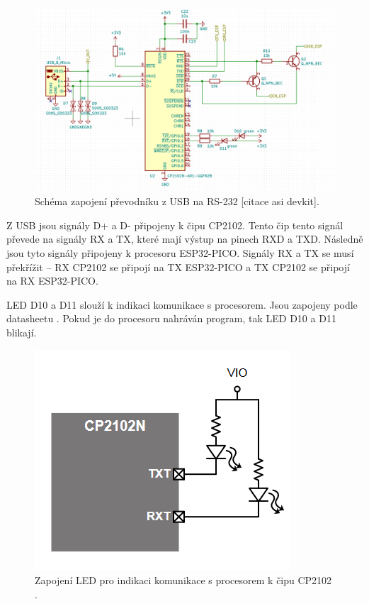 \begin{figure}[!h]
    \begin{center}
      \includegraphics[scale=0.5]{obrazky/CP2102_schema.png}
    \end{center}
    \caption[CP2102 schéma]{Schéma zapojení převodníku z USB na RS-232 [citace asi devkit].}
\end{figure}

Z USB jsou signály D+ a D- připojeny k čipu CP2102. Tento čip tento signál převede na signály RX a TX, které mají výstup 
na pinech RXD a TXD. Následně jsou tyto signály připojeny k procesoru ESP32-PICO. Signály RX a TX se musí překřížit – RX 
CP2102 se připojí na TX ESP32-PICO a TX CP2102 se připojí na RX ESP32-PICO. 

LED D10 a D11 slouží k indikaci komunikace s procesorem. Jsou zapojeny podle datasheetu \cite{CP2102_datasheet}. Pokud je do 
procesoru nahráván program, tak LED D10 a D11 blikají.

\begin{figure}[!h]
    \begin{center}
      \includegraphics[scale=0.5]{obrazky/CP2102_LED.png}
    \end{center}
    \caption[CP2102 LED]{Zapojení LED pro indikaci komunikace s procesorem k čipu CP2102 \cite{CP2102_datasheet}.}
\end{figure}

